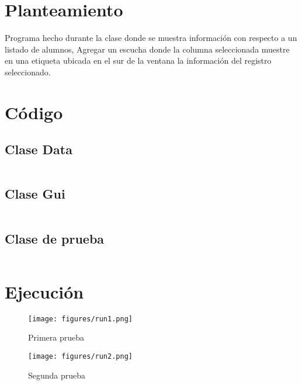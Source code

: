 \documentclass[12pt]{article}
\author{Pablo Vargas Bermúdez}
\begin{document}
\pagestyle{empty}



\section*{Planteamiento}

Programa hecho durante la clase donde se muestra información con
respecto a un listado de alumnos, Agregar un escucha donde la columna
seleccionada muestre en una etiqueta ubicada en el sur de la ventana
la información del registro seleccionado.

\section*{Código}

\subsection*{Clase Data}
\inputminted{Java}{Data.java}
\subsection*{Clase Gui}
\inputminted{Java}{Gui.java}
\subsection*{Clase de prueba}
\inputminted{Java}{Prueba.java}

\section*{Ejecución}

\begin{figure}[ht]
  \centering
  \texttt{[image: figures/run1.png]}
  \caption{Primera prueba}
\end{figure}

\begin{figure}[ht]
  \centering
  \texttt{[image: figures/run2.png]}
  \caption{Segunda prueba}
\end{figure}
\end{document}
